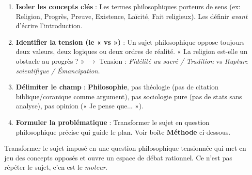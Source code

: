 \documentclass[11pt]{article}
\newcommand{\cle}[1]{{\popxbold\color{popdark}#1}}
\begin{document}
\begin{methode}
\begin{enumerate}
    \item \textbf{Isoler les concepts clés} : Les termes philosophiques porteurs de sens (ex: \cle{Religion}, \cle{Progrès}, \cle{Preuve}, \cle{Existence}, \cle{Laïcité}, \cle{Fait religieux}). Les définir \emph{avant} d'écrire l'introduction.
    \item \textbf{Identifier la tension (le « vs »)} : Un sujet philosophique oppose toujours deux valeurs, deux logiques ou deux ordres de réalité. « La religion est-elle un obstacle au progrès ? » $\rightarrow$ Tension : \emph{Fidélité au sacré / Tradition} vs \emph{Rupture scientifique / Émancipation}.
    \item \textbf{Délimiter le champ} : \textbf{Philosophie}, pas théologie (pas de citation biblique/coranique comme argument), pas sociologie pure (pas de stats sans analyse), pas opinion (« Je pense que... »).
    \item \textbf{Formuler la problématique} : Transformer le sujet en question philosophique précise qui guide le plan. Voir boîte \textbf{Méthode} ci-dessous.
\end{enumerate}
\end{methode}

\begin{definition}[Problématiser]
Transformer le sujet imposé en une \cle{question philosophique tensionnée} qui met en jeu des concepts opposés et ouvre un espace de débat rationnel. Ce n'est pas répéter le sujet, c'en est le \emph{moteur}.
\end{definition}
\end{document}
